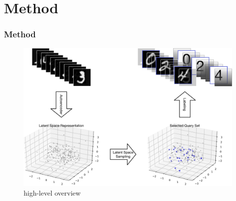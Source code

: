 \documentclass[10pt, usenames, dvipsnames, table]{beamer}
\begin{document}
\section{Method}
\label{sec:method}

\begin{frame}
  \frametitle{Method}
  \begin{figure}
    \centering
    \includegraphics[width=0.8\linewidth]{docs/overview}
    \caption{high-level overview}
    \label{fig:overview}
  \end{figure}
\end{frame}

\end{document}
